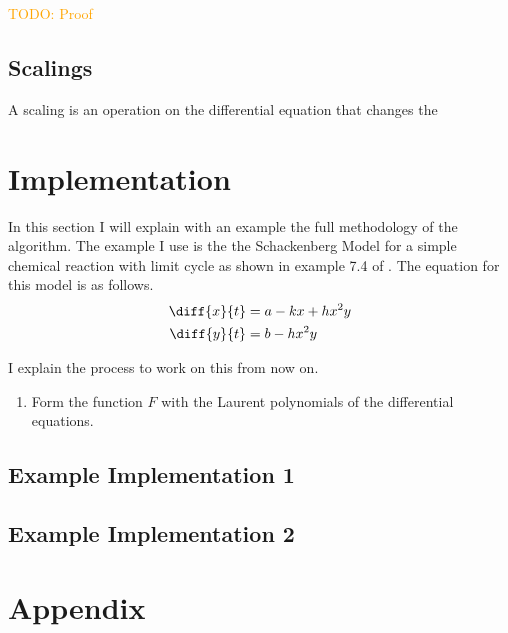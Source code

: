 \documentclass[oneside, a4paper, onecolumn, 11pt]{article}
\newcommand{\todo}[1]{
    \begin{mdframed}
        \textcolor{orange}{
        TODO: #1
        }
    \end{mdframed}
}
\begin{document}
\todo{Proof}


\subsection{Scalings}

A scaling is an operation on the differential equation that changes the

\section{Implementation}


In this section I will explain with an example the full methodology of the algorithm. The example I use is the the Schackenberg Model for a simple chemical reaction with limit cycle as shown in example 7.4 of \cite{Hubert2013}. The equation for this model is as follows.
\begin{align*}
    \diff{x}{t}
     & = a - kx + hx^2y \\
    \diff{y}{t}
     & = b - h x^2 y
\end{align*}

I explain the process to work on this from now on.

\begin{enumerate}[label=Step \arabic*:]
    \item Form the function \(F\) with the Laurent polynomials of the differential equations.
\end{enumerate}

\subsection{Example Implementation 1}

\subsection{Example Implementation 2}

\newpage



\newpage
\appendix

\section{Appendix}
\label{sec:appendix}
\end{document}
